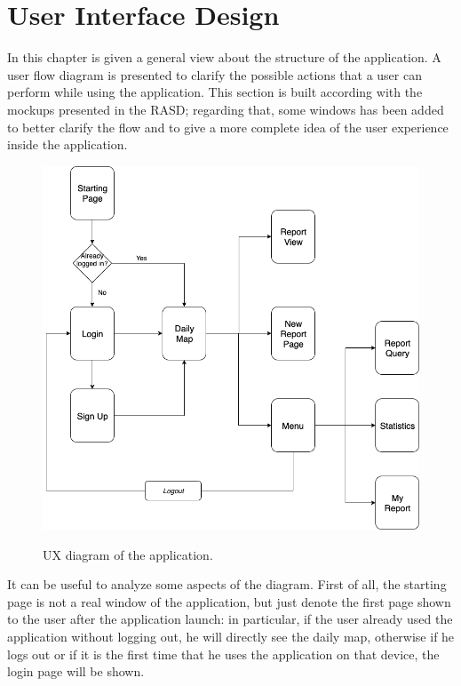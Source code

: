 \documentclass[../RASD.tex]{subfiles}
\begin{document}
    \chapter{User Interface Design}\label{ch:user-interface-design}
    In this chapter is given a general view about the structure of the application.
    A user flow diagram is presented to clarify the possible actions that a user can perform while using the application.
    This section is built according with the mockups presented in the RASD; regarding that, some windows has been added to better clarify
    the flow and to give a more complete idea of the user experience inside the application.
    \begin{figure}[H]
        \centering
        \includegraphics[scale = 1.5]{assets/ux.png}\\[1.6 cm]
        \caption[\textit{UX} Diagram]{UX diagram of the application.}
    \end{figure}
    It can be useful to analyze some aspects of the diagram.
    First of all, the starting page is not a real window of the application, but just denote the first page shown to the user after the application launch:
    in particular, if the user already used the application without logging out, he will directly see the daily map, otherwise if he logs out or if it is the first time
    that he uses the application on that device, the login page will be shown.
\end{document}
